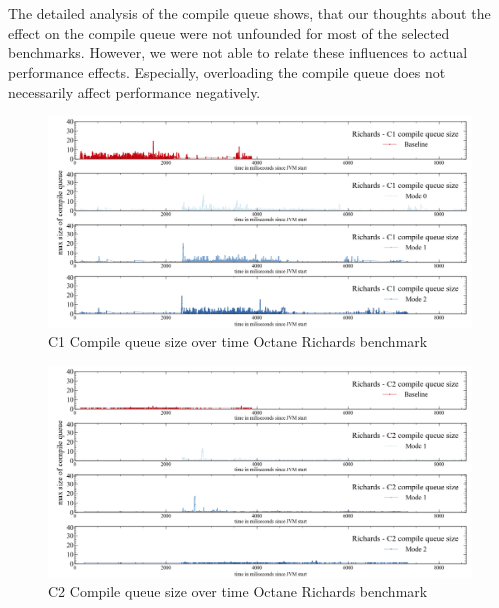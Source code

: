 \\\\
The detailed analysis of the compile queue shows, that our thoughts about the effect on the compile queue were not unfounded for most of the selected benchmarks. However, we were not able to relate these influences to actual performance effects. Especially, overloading the compile queue does not necessarily affect performance negatively.
\begin{figure}[ht]
  \begin{center}
    \centering
    \includegraphics[width=1.0\textwidth]{figures/octane_queue_richards_separate_c1.png}
    \caption{C1 Compile queue size over time Octane Richards benchmark}
    \label{f:octane_queue_richards_separate_c1}
  \end{center}
\end{figure}
\begin{figure}[ht]
  \begin{center}
    \centering
    \includegraphics[width=1.0\textwidth]{figures/octane_queue_richards_separate_c2.png}
    \caption{C2 Compile queue size over time Octane Richards benchmark}
    \label{f:octane_queue_richards_separate_c2}
  \end{center}
\end{figure}
